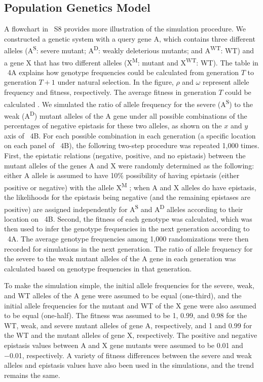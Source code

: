 \subsection{Population Genetics Model} A flowchart in \Fig~S8 provides
more illustration of the simulation procedure. We constructed a
genetic system with a query gene A, which contains three different
alleles (A\textsuperscript{S}: severe mutant; A\textsuperscript{D}:
weakly deleterious mutants; and A\textsuperscript{WT}: WT) and a gene
X that has two different alleles (X\textsuperscript{M}: mutant and
X\textsuperscript{WT}: WT). The table in \Fig~4A explains how genotype
frequencies could be calculated from generation $T$ to generation
$T+1$ under natural selection. In the figure, $\rho$ and $\omega$
represent allele frequency and fitness, respectively. The average
fitness in generation $T$ could be calculated \citep{Hartl2007}.  We
simulated the ratio of allele frequency for the severe
(A\textsuperscript{S}) to the weak (A\textsuperscript{D}) mutant
alleles of the A gene under all possible combinations
of the percentages of negative epistasis for these two alleles, as
shown on the $x$ and $y$ axis of \Fig~4B. For each possible
combination in each generation (a specific location on each panel of
\Fig~4B), the following two-step procedure was repeated 1,000
times. First, the epistatic relations (negative, positive, and no
epistasis) between the mutant alleles of the genes A and X were
randomly determined as the following: either A allele is assumed to
have 10\% possibility of having epistasis (either positive or
negative) with the allele X\textsuperscript{M} \citep{Costanzo2010}; when A and X
alleles do have epistasis, the likelihoods for the epistasis being
negative (and the remaining epistases are positive) are assigned
independently for A\textsuperscript{S} and A\textsuperscript{D}
alleles according to their location on \Fig~4B. Second, the fitness of
each genotype was calculated, which was then used to infer
the genotype frequencies in the next generation according to
\Fig~4A. The average genotype frequencies among 1,000 randomizations
were then recorded for simulations in the next generation. The ratio
of allele frequency for the severe to the weak mutant alleles of the A
gene in each generation was calculated based on genotype frequencies
in that generation.

To make the simulation simple, the initial allele frequencies for the
severe, weak, and WT alleles of the A gene were assumed to be equal
(one-third), and the initial allele frequencies for the mutant and WT
of the X gene were also assumed to be equal (one-half). The fitness
was assumed to be 1, 0.99, and 0.98 for the WT, weak, and severe
mutant alleles of gene A, respectively, and 1 and 0.99 for the WT and
the mutant alleles of gene X, respectively. The positive and negative
epistasis values between A and X gene mutants were assumed to be 0.01
and −0.01, respectively. A variety of fitness differences between the
severe and weak alleles and epistasis values have also been used in
the simulations, and the trend remains the same.

